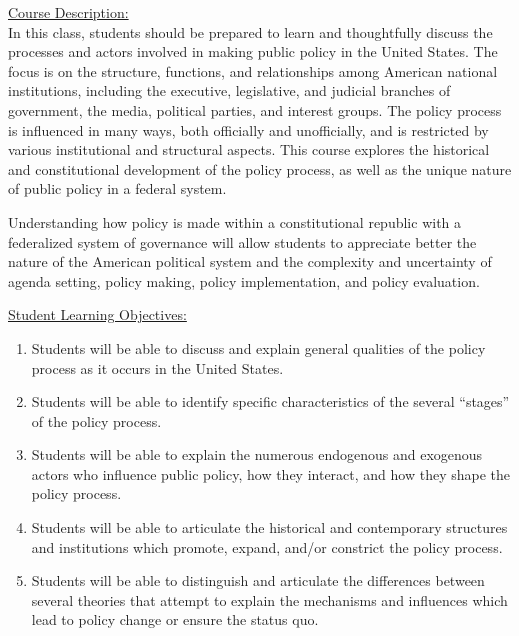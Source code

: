 \documentclass[11pt]{article}
\begin{document}
\begin{description}
	
	\item \underline{Course Description:} \\
	In this class, students should be prepared to learn and thoughtfully discuss the processes and actors involved in making public policy in the United States. The focus is on the structure, functions, and relationships among American national institutions, including the executive, legislative, and judicial branches of government, the media, political parties, and interest groups. The policy process is influenced in many ways, both officially and unofficially, and is restricted by various institutional and structural aspects. This course explores the historical and constitutional development of the policy process, as well as the unique nature of public policy in a federal system.  
	
	Understanding how policy is made within a constitutional republic with a federalized system of governance will allow students to appreciate better the nature of the American political system and the complexity and uncertainty of agenda setting, policy making, policy implementation, and policy evaluation.
		
	\item \underline{Student Learning Objectives:} 
	    \begin{enumerate}
	   		 \item Students will be able to discuss and explain general qualities of the policy process as it occurs in the United States.
		 
	   		 \item Students will be able to identify specific characteristics of the several ``stages'' of the policy process. 
		 
	   		 \item Students will be able to explain the numerous endogenous and exogenous actors who influence public policy, how they interact, and how they shape the policy process. 
		 
	   		 \item Students will be able to articulate the historical and contemporary structures and institutions which promote, expand, and/or constrict the policy process. 
	     
	   	     \item Students will be able to distinguish and articulate the differences between several theories that attempt to explain the mechanisms and influences which lead to policy change or ensure the status quo.
		 

\end{enumerate}
\end{description}
\end{document}
